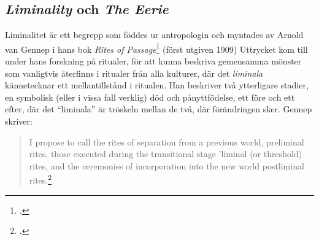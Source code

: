 \documentclass{article}
\begin{document}
\subsection{\emph{Liminality} och \emph{The Eerie}}
Liminalitet är ett begrepp som föddes ur antropologin och myntades av Arnold van Gennep i hans bok \emph{Rites
of Passage}\footcite{Gennep} (först utgiven 1909) Uttrycket kom till under hans forskning på ritualer, för att kunna beskriva
gemensamma mönster som vanligtvis återfinns i ritualer från alla kulturer, där det \emph{liminala}
kännetecknar ett mellantillstånd i ritualen. Han beskriver två ytterligare stadier, en symbolisk (eller i
vissa fall verklig) död och pånyttfödelse, ett före och ett efter, där det ``liminala'' är
tröskeln mellan de två, där förändringen sker.
Gennep skriver:

\begin{quote}
I propose to call the rites of separation from a previous world, preliminal rites, those executed during the
transitional stage 'liminal (or threshold) rites, and the ceremonies of incorporation into the new world
	postliminal rites.\footcite[21]{Gennep}
\end{quote}

\end{document}
